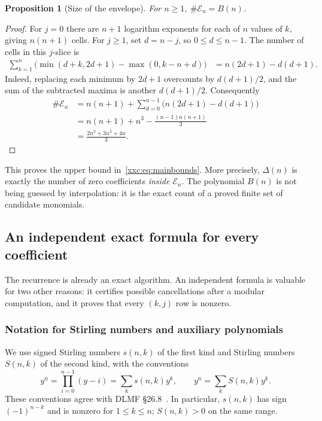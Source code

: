 \documentclass[11pt,a4paper]{article}
\numberwithin{equation}{section}
\newtheorem{proposition}[theorem]{Proposition}
\theoremstyle{definition}
\theoremstyle{remark}
\theoremstyle{plain}
\newcommand{\fall}[2]{#1^{\underline{#2}}}
\begin{document}
\begin{proposition}[Size of the envelope]\label{xxc:prop:envelopesize}
For $n\ge1$, $\#\mathcal E_n=B(n)$.
\end{proposition}
\begin{proof}
For $j=0$ there are $n+1$ logarithm exponents for each of $n$ values of $k$,
giving $n(n+1)$ cells. For $j\ge1$, set $d=n-j$, so $0\le d\le n-1$.
The number of cells in this $j$-slice is
\begin{align*}
 \sum_{k=1}^n\bigl(\min(d+k,2d+1)-\max(0,k-n+d)\bigr)
 &=n(2d+1)-d(d+1).
\end{align*}
Indeed, replacing each minimum by $2d+1$ overcounts by
$d(d+1)/2$, and the sum of the subtracted maxima is another $d(d+1)/2$.
Consequently
\begin{align*}
 \#\mathcal E_n
 &=n(n+1)+\sum_{d=0}^{n-1}\bigl(n(2d+1)-d(d+1)\bigr)\\
 &=n(n+1)+n^3-\frac{(n-1)n(n+1)}3\\
 &=\frac{2n^3+3n^2+4n}{3}.
\end{align*}
\end{proof}

This proves the upper bound in~\eqref{xxc:eq:mainbounds}. More precisely,
$\Delta(n)$ is exactly the number of zero coefficients \emph{inside}
$\mathcal E_n$. The polynomial $B(n)$ is not being guessed by interpolation:
it is the exact count of a proved finite set of candidate monomials.

\subsection{An independent exact formula for every coefficient}

The recurrence is already an exact algorithm. An independent formula is
valuable for two other reasons: it certifies possible cancellations after a
modular computation, and it proves that every $(k,j)$ row is nonzero.

\subsubsection{Notation for Stirling numbers and auxiliary polynomials}

We use signed Stirling numbers $s(n,k)$ of the first kind and Stirling
numbers $S(n,k)$ of the second kind, with the conventions
\[
 \fall{y}{n}=\prod_{i=0}^{n-1}(y-i)=\sum_k s(n,k)y^k,
 \qquad y^n=\sum_k S(n,k)\fall{y}{k}.
\]
These conventions agree with DLMF \S26.8~\cite{dlmf}. In particular,
$s(n,k)$ has sign $(-1)^{n-k}$ and is nonzero for $1\le k\le n$;
$S(n,k)>0$ on the same range.
\end{document}
